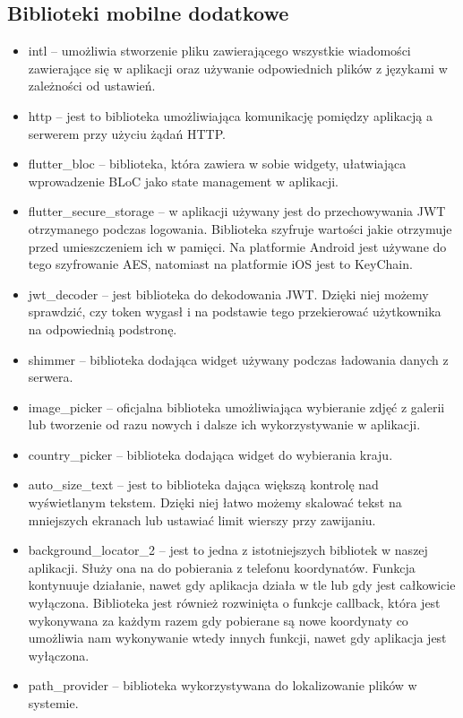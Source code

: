 \documentclass[a4paper,twoside,12pt]{book}
\begin{document}
\subsection{Biblioteki mobilne dodatkowe}
\begin{itemize}
    \item intl -- umożliwia stworzenie pliku zawierającego wszystkie wiadomości zawierające się w aplikacji oraz używanie odpowiednich plików z językami w zależności od ustawień.
    \item http -- jest to biblioteka umożliwiająca komunikację pomiędzy aplikacją a serwerem przy użyciu żądań HTTP.
    \item flutter\_bloc -- biblioteka, która zawiera w sobie widgety, ułatwiająca wprowadzenie BLoC jako state management w aplikacji.
    \item flutter\_secure\_storage -- w aplikacji używany jest do przechowywania JWT otrzymanego podczas logowania. Biblioteka szyfruje wartości jakie otrzymuje przed umieszczeniem ich w pamięci. Na platformie Android jest używane do tego szyfrowanie AES, natomiast na platformie iOS jest to KeyChain. 
    \item jwt\_decoder -- jest biblioteka do dekodowania JWT. Dzięki niej możemy sprawdzić, czy token wygasł i na podstawie tego przekierować użytkownika na odpowiednią podstronę.
    \item shimmer -- biblioteka dodająca widget używany podczas ładowania danych z serwera.
    \item image\_picker -- oficjalna biblioteka umożliwiająca wybieranie zdjęć z galerii lub tworzenie od razu nowych i dalsze ich wykorzystywanie w aplikacji.
    \item country\_picker -- biblioteka dodająca widget do wybierania kraju.
    \item auto\_size\_text -- jest to biblioteka dająca większą kontrolę nad wyświetlanym tekstem. Dzięki niej łatwo możemy skalować tekst na mniejszych ekranach lub ustawiać limit wierszy przy zawijaniu.
    \item background\_locator\_2 -- jest to jedna z istotniejszych bibliotek w naszej aplikacji. Służy ona na do pobierania z telefonu koordynatów. Funkcja kontynuuje działanie, nawet gdy aplikacja działa w tle lub gdy jest całkowicie wyłączona. Biblioteka jest również rozwinięta o funkcje callback, która jest wykonywana za każdym razem gdy pobierane są nowe koordynaty co umożliwia nam wykonywanie wtedy innych funkcji, nawet gdy aplikacja jest wyłączona.
    \item path\_provider -- biblioteka wykorzystywana do lokalizowanie plików w systemie.

\end{itemize}
\end{document}
